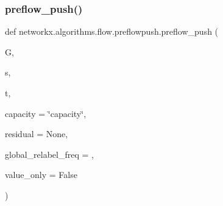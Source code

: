 \subsubsection{\texorpdfstring{preflow\+\_\+push()}{preflow\_push()}}
{\footnotesize\ttfamily def networkx.\+algorithms.\+flow.\+preflowpush.\+preflow\+\_\+push (\begin{DoxyParamCaption}\item[{}]{G,  }\item[{}]{s,  }\item[{}]{t,  }\item[{}]{capacity = {\ttfamily \char`\"{}capacity\char`\"{}},  }\item[{}]{residual = {\ttfamily None},  }\item[{}]{global\+\_\+relabel\+\_\+freq = {},  }\item[{}]{value\+\_\+only = {\ttfamily False} }\end{DoxyParamCaption})}

